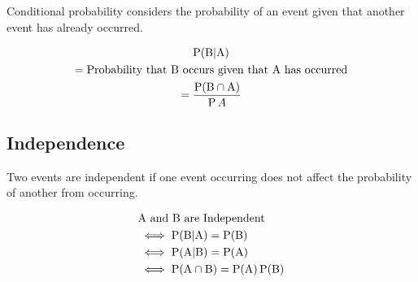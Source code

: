 \documentclass[../main]{subfiles}
\begin{document}
	Conditional probability considers the probability of an event given that another event has already occurred.

	\begin{equation*} \begin{gathered}
		\operatorname{P}(\text{B} | \text{A}) \\
		= \text{Probability that B occurs given that A has occurred} \\
		= \frac{\operatorname{P}(\text{B} \cap \text{A})}{\operatorname{P}{A}}
	\end{gathered} \end{equation*}

	\subsection{Independence}

	Two events are independent if one event occurring does not affect the probability of another from occurring.

	\begin{equation*} \begin{aligned}
		& \text{A and B are Independent} \\
		& \iff \operatorname{P}(\text{B} | \text{A}) = \operatorname{P}(\text{B}) \\
		& \iff \operatorname{P}(\text{A} | \text{B}) = \operatorname{P}(\text{A}) \\
		& \iff \operatorname{P}(\text{A} \cap \text{B}) = \operatorname{P}(\text{A}) \operatorname{P}(\text{B}) \\
	\end{aligned} \end{equation*}
\end{document}
